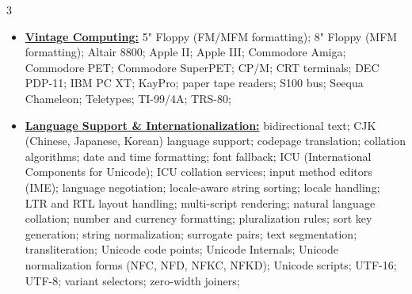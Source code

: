 \documentclass[letterpaper,11pt]{article}
\begin{document}
\begin{multicols}{3}
{\begin{itemize}[leftmargin=0.1in, label={}, itemsep=0pt, parsep=0pt, topsep=0pt, partopsep=0pt]
                \item
                \textbf{\uline{Vintage Computing:}} \hspace{0pt}
                5" Floppy (FM/MFM formatting);
                8" Floppy (MFM formatting);
                Altair 8800;
                Apple II;
                Apple III;
                Commodore Amiga;
                Commodore PET;
                Commodore SuperPET;
                CP/M;
                CRT terminals;
                DEC PDP-11;
                IBM PC XT;
                KayPro;
                paper tape readers;
                S100 bus;
                Seequa Chameleon;
                Teletypes;
                TI-99/4A;
                TRS-80;

                \item
                \textbf{\uline{Language Support \& Internationalization:}} \hspace{0pt}
                bidirectional text;
                CJK (Chinese, Japanese, Korean) language support;
                codepage translation;
                collation algorithms;
                date and time formatting;
                font fallback;
                ICU (International Components for Unicode);
                ICU collation services;
                input method editors (IME);
                language negotiation;
                locale-aware string sorting;
                locale handling;
                LTR and RTL layout handling;
                multi-script rendering;
                natural language collation;
                number and currency formatting;
                pluralization rules;
                sort key generation;
                string normalization;
                surrogate pairs;
                text segmentation;
                transliteration;
                Unicode code points;
                Unicode Internals;
                Unicode normalization forms (NFC, NFD, NFKC, NFKD);
                Unicode scripts;
                UTF-16;
                UTF-8;
                variant selectors;
                zero-width joiners;


\end{itemize}}
\end{multicols}
\end{document}
